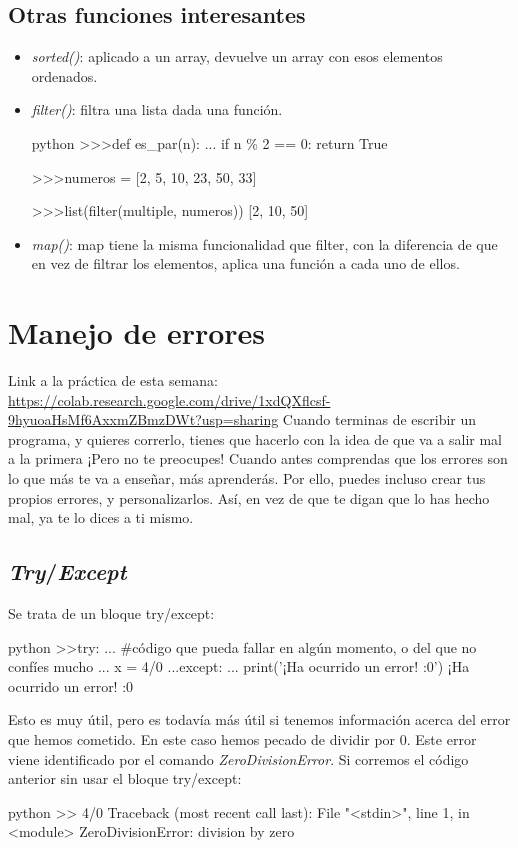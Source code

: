 \documentclass{article}
\begin{document}
\subsection{Otras funciones interesantes}
\begin{itemize}
    \item \textit{sorted()}: aplicado a un array, devuelve un array con esos elementos ordenados.
    \item \textit{filter()}: filtra una lista dada una función.
    \begin{mintedbox}{python}
    >>>def es_par(n):   
    ...    if n \% 2 == 0:  
            return True

    >>>numeros = [2, 5, 10, 23, 50, 33]

    >>>list(filter(multiple, numeros))
    [2, 10, 50]
    \end{mintedbox}
    \item \textit{map()}: map tiene la misma funcionalidad que filter, con la diferencia de que en vez de filtrar los elementos, aplica una función a cada uno de ellos.
\end{itemize}

\section{Manejo de errores}
Link a la práctica de esta semana: \url{https://colab.research.google.com/drive/1xdQXflcsf-9hyuoaHsMf6AxxmZBmzDWt?usp=sharing}
Cuando terminas de escribir un programa, y quieres correrlo, tienes que hacerlo con la idea de que va a salir mal a la primera ¡Pero no te preocupes! Cuando antes comprendas que los errores son lo que más te va a enseñar, más aprenderás. Por ello, puedes incluso crear tus propios errores, y personalizarlos. Así, en vez de que te digan que lo has hecho mal, ya te lo dices a ti mismo.

\subsection{\textit{Try}/\textit{Except}}
Se trata de un bloque try/except:
\begin{mintedbox}{python}
>>try:
...     #código que pueda fallar en algún momento, o del que no confíes mucho
...     x = 4/0
...except:
...     print('¡Ha ocurrido un error! :0')
¡Ha ocurrido un error! :0
\end{mintedbox}

Esto es muy útil, pero es todavía más útil si tenemos información acerca del error que hemos cometido. En este caso hemos pecado de dividir por 0. Este error viene identificado por el comando \textit{ZeroDivisionError}. Si corremos el código anterior sin usar el bloque try/except:
\begin{mintedbox}{python}
>> 4/0
Traceback (most recent call last):
  File "<stdin>", line 1, in <module>
ZeroDivisionError: division by zero
\end{mintedbox}
\end{document}

